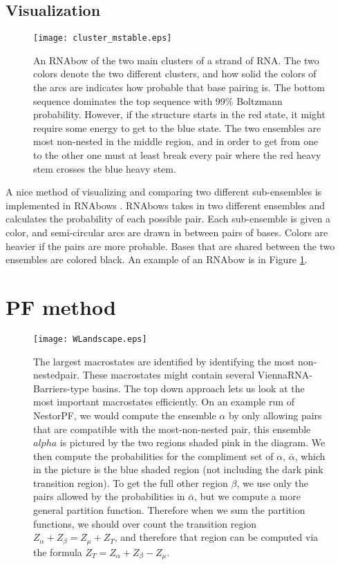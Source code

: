 \subsection{Visualization}
\begin{figure}[t]
\texttt{[image: cluster\_mstable.eps]}
\caption[RNAbows]{An RNAbow of the two main clusters of a strand of RNA. The
  two colors denote the two different clusters, and how solid the
  colors of the arcs are indicates how probable that base pairing
  is. The bottom sequence dominates the top sequence with 99\%
  Boltzmann probability. However, if the structure starts in the red
  state, it might require some energy to get to the blue state. The
  two ensembles are most non-nested in the middle region, and in order
  to get from one to the other one must at least break every pair
  where the red heavy stem crosses the blue heavy stem.}
\label{fig:rnaBow}
\end{figure}

A nice method of visualizing and comparing two different sub-ensembles
is implemented in RNAbows \cite{aalberts2013visualizing}. RNAbows
takes in two different ensembles and calculates the probability of
each possible pair. Each sub-ensemble is given a color, and
semi-circular arcs are drawn in between pairs of bases. Colors are
heavier if the pairs are more probable. Bases that are shared between
the two ensembles are colored black. An example of an RNAbow is in
Figure \ref{fig:rnaBow}.

\section{PF method}
\begin{figure}[t]
\center
\texttt{[image: WLandscape.eps]}
\caption[Free Energy Landscape]{The largest macrostates are identified by identifying the
  most non-nestedpair. These macrostates might contain several
  ViennaRNA-Barriers-type basins. The top down approach lets us look
  at the most important macrostates efficiently. On an example run of
  NestorPF, we would compute the ensemble $\alpha$ by only allowing
  pairs that are compatible with the most-non-nested pair, this
  ensemble $alpha$ is pictured by the two regions shaded pink in the
  diagram. We then compute the probabilities for the compliment set of
  $\alpha$, $\bar \alpha$, which in the picture is the blue shaded
  region (not including the dark pink transition region). To get the
  full other region $\beta$, we use only the pairs allowed by the
  probabilities in $\bar \alpha$, but we compute a more general
  partition function. Therefore when we sum the partition functions,
  we should over count the transition region
  $Z_\alpha+Z_\beta=Z_\mu+Z_T$, and therefore that region can be
  computed via the formula $Z_T = Z_\alpha + Z_\beta - Z_\mu$. }
\label{fig:landscape}
\end{figure}

